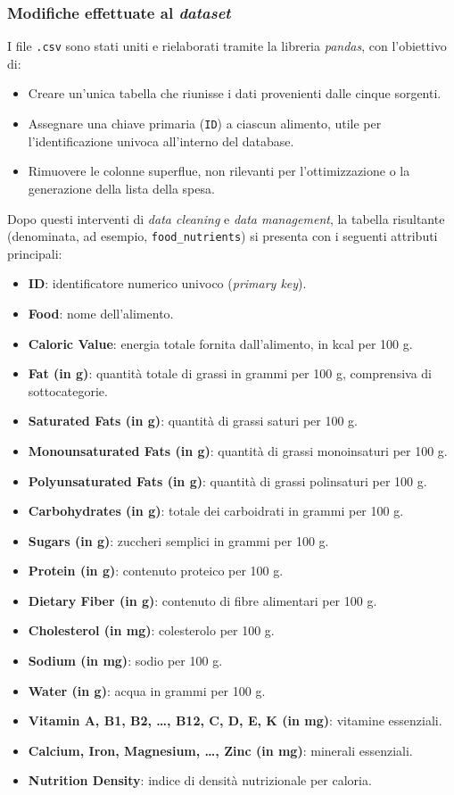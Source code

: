 \documentclass[11pt,a4paper]{article}
\begin{document}
\subsubsection{Modifiche effettuate al \textit{dataset}}
I file \texttt{.csv} sono stati uniti e rielaborati tramite la libreria \textit{pandas}, con l’obiettivo di:
\begin{itemize}
    \item Creare un’unica tabella che riunisse i dati provenienti dalle cinque sorgenti.
    \item Assegnare una chiave primaria (\texttt{ID}) a ciascun alimento, utile per l’identificazione univoca all’interno del database.
    \item Rimuovere le colonne superflue, non rilevanti per l’ottimizzazione o la generazione della lista della spesa.
\end{itemize}

Dopo questi interventi di \textit{data cleaning} e \textit{data management}, la tabella risultante (denominata, ad esempio, \texttt{food\_nutrients}) si presenta con i seguenti attributi principali:
\begin{itemize}
    \item \textbf{ID}: identificatore numerico univoco (\textit{primary key}).
    \item \textbf{Food}: nome dell’alimento.
    \item \textbf{Caloric Value}: energia totale fornita dall’alimento, in kcal per 100 g.
    \item \textbf{Fat (in g)}: quantità totale di grassi in grammi per 100 g, comprensiva di sottocategorie.
    \item \textbf{Saturated Fats (in g)}: quantità di grassi saturi per 100 g.
    \item \textbf{Monounsaturated Fats (in g)}: quantità di grassi monoinsaturi per 100 g.
    \item \textbf{Polyunsaturated Fats (in g)}: quantità di grassi polinsaturi per 100 g.
    \item \textbf{Carbohydrates (in g)}: totale dei carboidrati in grammi per 100 g.
    \item \textbf{Sugars (in g)}: zuccheri semplici in grammi per 100 g.
    \item \textbf{Protein (in g)}: contenuto proteico per 100 g.
    \item \textbf{Dietary Fiber (in g)}: contenuto di fibre alimentari per 100 g.
    \item \textbf{Cholesterol (in mg)}: colesterolo per 100 g.
    \item \textbf{Sodium (in mg)}: sodio per 100 g.
    \item \textbf{Water (in g)}: acqua in grammi per 100 g.
    \item \textbf{Vitamin A, B1, B2, \ldots, B12, C, D, E, K (in mg)}: vitamine essenziali.
    \item \textbf{Calcium, Iron, Magnesium, \ldots, Zinc (in mg)}: minerali essenziali.
    \item \textbf{Nutrition Density}: indice di densità nutrizionale per caloria.
\end{itemize}
\end{document}
